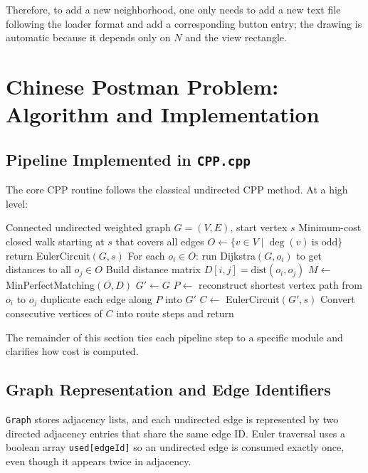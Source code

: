 \documentclass[conference]{IEEEtran}
\begin{document}
Therefore, to add a new neighborhood, one only needs to add a new text file following the loader format and add a corresponding button entry; the drawing is automatic because it depends only on $N$ and the view rectangle.

\section{Chinese Postman Problem: Algorithm and Implementation}
\subsection{Pipeline Implemented in \texttt{CPP.cpp}}
The core CPP routine follows the classical undirected CPP method.
At a high level:

\begin{algorithm}[t]
\caption{Undirected Chinese Postman as Implemented}
\label{alg:cpp}
\begin{algorithmic}[1]
\Require Connected undirected weighted graph $G=(V,E)$, start vertex $s$
\Ensure Minimum-cost closed walk starting at $s$ that covers all edges
\State $O \gets \{v \in V \mid \deg(v)\ \text{is odd}\}$
  \State return EulerCircuit$(G,s)$
\EndIf
\State For each $o_i \in O$: run Dijkstra$(G,o_i)$ to get distances to all $o_j\in O$
\State Build distance matrix $D[i,j] = \text{dist}(o_i,o_j)$
\State $M \gets$ MinPerfectMatching$(O,D)$
\State $G' \gets G$ 
  \State $P \gets$ reconstruct shortest vertex path from $o_i$ to $o_j$
  \State duplicate each edge along $P$ into $G'$
\EndFor
\State $C \gets$ EulerCircuit$(G',s)$
\State Convert consecutive vertices of $C$ into route steps and return
\end{algorithmic}
\end{algorithm}

The remainder of this section ties each pipeline step to a specific module and clarifies how cost is computed.

\subsection{Graph Representation and Edge Identifiers}
\texttt{Graph} stores adjacency lists, and each undirected edge is represented by two directed adjacency entries that share the same edge ID.
Euler traversal uses a boolean array \texttt{used[edgeId]} so an undirected edge is consumed exactly once, even though it appears twice in adjacency.
\end{document}
